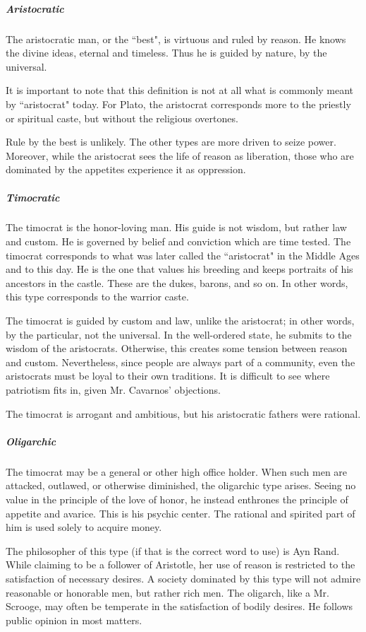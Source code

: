 \subparagraph{Aristocratic}
The aristocratic man, or the ``best", is virtuous and ruled by reason. He knows the divine ideas, eternal and timeless. Thus he is guided by nature, by the universal.

It is important to note that this definition is not at all what is commonly meant by ``aristocrat" today. For Plato, the aristocrat corresponds more to the priestly or spiritual caste, but without the religious overtones.

Rule by the best is unlikely. The other types are more driven to seize power. Moreover, while the aristocrat sees the life of reason as liberation, those who are dominated by the appetites experience it as oppression.

\subparagraph{Timocratic}
The timocrat is the honor-loving man. His guide is not wisdom, but rather law and custom. He is governed by belief and conviction which are time tested. The timocrat corresponds to what was later called the ``aristocrat" in the Middle Ages and to this day. He is the one that values his breeding and keeps portraits of his ancestors in the castle. These are the dukes, barons, and so on. In other words, this type corresponds to the warrior caste.

The timocrat is guided by custom and law, unlike the aristocrat; in other words, by the particular, not the universal. In the well-ordered state, he submits to the wisdom of the aristocrats. Otherwise, this creates some tension between reason and custom. Nevertheless, since people are always part of a community, even the aristocrats must be loyal to their own traditions. It is difficult to see where patriotism fits in, given Mr. Cavarnos' objections.

The timocrat is arrogant and ambitious, but his aristocratic fathers were rational.

\subparagraph{Oligarchic}
The timocrat may be a general or other high office holder. When such men are attacked, outlawed, or otherwise diminished, the oligarchic type arises. Seeing no value in the principle of the love of honor, he instead enthrones the principle of appetite and avarice. This is his psychic center. The rational and spirited part of him is used solely to acquire money.

The philosopher of this type (if that is the correct word to use) is Ayn Rand. While claiming to be a follower of Aristotle, her use of reason is restricted to the satisfaction of necessary desires. A society dominated by this type will not admire reasonable or honorable men, but rather rich men. The oligarch, like a Mr. Scrooge, may often be temperate in the satisfaction of bodily desires. He follows public opinion in most matters.

